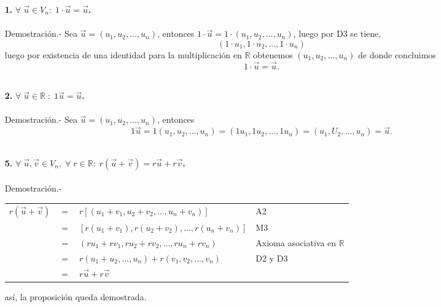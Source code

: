 \begin{enumerate}

\item[\large\bfseries 1.] \textbf{\boldmath $\forall\; \vec{u} \in V_n:\;  1\cdot \vec{u} = \vec{u}$.}\\\\
    Demostración.-\; Sea $\vec{u} = (u_1,u_2,...,u_n)$, entonces $1\cdot \vec{u} = 1\cdot (u_1,u_2,...,u_n)$, luego por D3 se tiene, $$(1\cdot u_1,1\cdot u_2,...,1\cdot u_n)$$
    luego por existencia de una identidad para la multiplicación en $\mathbb{R}$ obtenemos $(u_1,u_2,...,u_n)$ de donde concluimos $$1\cdot \vec{u} = \vec{u}.$$\\

\item[\large\bfseries 2.] \textbf{\boldmath $\forall\; \vec{u} \in \mathbb{R}\; :\; 1\vec{u}=\vec{u}$.}\\\\
    Demostración.-\; Sea $\vec{u}=(u_1,u_2,\ldots , u_n)$, entonces
    $$1\vec{u}=1(u_1,u_2,\ldots , u_n)=(1u_1, 1u_2, \ldots , 1u_n) = (u_1,U_2,\ldots , u_n)=\vec{u}.$$\\

    \item[\large\bfseries 5.] \textbf{\boldmath $\forall\; \vec{u},\vec{v} \in V_n, \; \forall\; r \in \mathbb{R}:\; r(\vec{u}+\vec{v}) = r\vec{u} + r\vec{v}$.}\\\\
    Demostración.-\; 
    \begin{center}
	\begin{tabular}{rcll}
	    $r(\vec{u}+\vec{v})$&$=$&$r\left[(u_1+v_1,u_2+v_2,...,u_n+v_n)\right]$&A2\\
	    &$=$&$\left[r(u_1+v_1),r(u_2+v_2),...,r(u_n+v_n)\right]$&M3\\
	    &$=$&$(ru_1+rv_1,ru_2+rv_2,...,ru_n+rv_n)$&Axioma asociativa en $\mathbb{R}$\\
	    &$=$&$r(u_1+u_2,...,u_n)+r(v_1,v_2,...,v_n)$&D2 y D3\\
	    &$=$&$r\vec{u} + r\vec{v}$&\\
	\end{tabular}
    \end{center}
    así, la proposición queda demostrada.\\\\

\end{enumerate}
